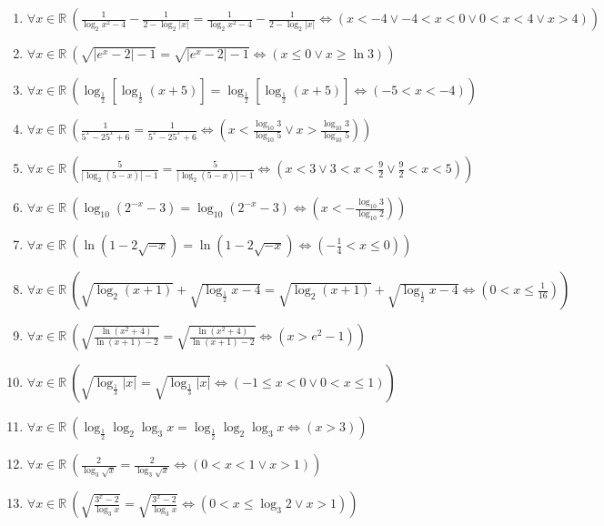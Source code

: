 \documentclass[11pt,a4paper]{article}
\begin{document}
\begin{enumerate}
\item $\displaystyle \forall x \in \mathbb{R}\ \left( \frac{1}{\log_{2} x^{2} - 4} - \frac{1}{2 - \log_{2}\left| x \right|} = \frac{1}{\log_{2} x^{2} - 4} - \frac{1}{2 - \log_{2}\left| x \right|} \iff \left( x < -4 \lor -4 < x < 0 \lor 0 < x < 4 \lor x > 4 \right) \right)$
\item $\displaystyle \forall x \in \mathbb{R}\ \left( \sqrt{\left| e^{x} - 2 \right| - 1} = \sqrt{\left| e^{x} - 2 \right| - 1} \iff \left( x \le 0 \lor x \ge \ln 3 \right) \right)$
\item $\displaystyle \forall x \in \mathbb{R}\ \left( \log_{\frac{1}{2}}\left[\log_{\frac{1}{2}}(x + 5)\right] = \log_{\frac{1}{2}}\left[\log_{\frac{1}{2}}(x + 5)\right] \iff \left( -5 < x < -4 \right) \right)$
\item $\displaystyle \forall x \in \mathbb{R}\ \left( \frac{1}{5^{x} - 25^{x} + 6} = \frac{1}{5^{x} - 25^{x} + 6} \iff \left( x < \frac{\log_{10} 3}{\log_{10} 5} \lor x > \frac{\log_{10} 3}{\log_{10} 5} \right) \right)$
\item $\displaystyle \forall x \in \mathbb{R}\ \left( \frac{5}{\left| \log_{2}(5 - x) \right| - 1} = \frac{5}{\left| \log_{2}(5 - x) \right| - 1} \iff \left( x < 3 \lor 3 < x < \frac{9}{2} \lor \frac{9}{2} < x < 5 \right) \right)$
\item $\displaystyle \forall x \in \mathbb{R}\ \left( \log_{10}(2^{-x} - 3) = \log_{10}(2^{-x} - 3) \iff \left( x < -\frac{\log_{10} 3}{\log_{10} 2} \right) \right)$
\item $\displaystyle \forall x \in \mathbb{R}\ \left( \ln(1 - 2\sqrt{-x}) = \ln(1 - 2\sqrt{-x}) \iff \left( -\frac{1}{4} < x \le 0 \right) \right)$
\item $\displaystyle \forall x \in \mathbb{R}\ \left( \sqrt{\log_{2}(x + 1)} + \sqrt{\log_{\frac{1}{2}} x - 4} = \sqrt{\log_{2}(x + 1)} + \sqrt{\log_{\frac{1}{2}} x - 4} \iff \left( 0 < x \le \frac{1}{16} \right) \right)$
\item $\displaystyle \forall x \in \mathbb{R}\ \left( \sqrt{\frac{\ln(x^{2} + 4)}{\ln(x + 1) - 2}} = \sqrt{\frac{\ln(x^{2} + 4)}{\ln(x + 1) - 2}} \iff \left( x > e^{2} - 1 \right) \right)$
\item $\displaystyle \forall x \in \mathbb{R}\ \left( \sqrt{\log_{\frac{1}{3}}\left| x \right|} = \sqrt{\log_{\frac{1}{3}}\left| x \right|} \iff \left( -1 \le x < 0 \lor 0 < x \le 1 \right) \right)$
\item $\displaystyle \forall x \in \mathbb{R}\ \left( \log_{\frac{1}{2}}\log_{2}\log_{3} x = \log_{\frac{1}{2}}\log_{2}\log_{3} x \iff \left( x > 3 \right) \right)$
\item $\displaystyle \forall x \in \mathbb{R}\ \left( \frac{2}{\log_{3}\sqrt{x}} = \frac{2}{\log_{3}\sqrt{x}} \iff \left( 0 < x < 1 \lor x > 1 \right) \right)$
\item $\displaystyle \forall x \in \mathbb{R}\ \left( \sqrt{\frac{3^{x} - 2}{\log_{3} x}} = \sqrt{\frac{3^{x} - 2}{\log_{3} x}} \iff \left( 0 < x \le \log_{3} 2 \lor x > 1 \right) \right)$
\end{enumerate}
\end{document}
